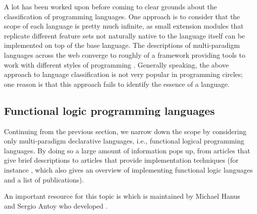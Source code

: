 \documentclass[thesis-solanki.tex]{subfiles}
\begin{document}
A lot has been worked upon before coming to clear grounds about the classification of programming languages.
One approach is to consider that the scope of each language is pretty much infinite, as small extension modules
that replicate different feature sets not naturally native to the language itself can be implemented on top of the
base language.
The descriptions of multi-paradigm languages across the web
\cite{website:wikimultiparadigm,website:mdn,website:blogc2} converge to roughly of a framework providing tools to
work with different styles of programming \cite{website:wikimpllist,website:dmoz}.
Generally speaking, the above approach to language classification is not very popular in programming circles; one
reason is that this approach fails to identify the essence of a language.

\subsection{Functional logic programming languages}

Continuing from the previous section, we narrow down the scope by considering only multi-paradigm declarative
languages, i.e., functional logical programming languages.
By doing so a large amount of information pops up, from articles that give brief descriptions
\cite{website:wikiflpl, website:wikiflpllist} to articles that provide implementation techniques (for instance
\cite{website:imlpementingflpl}, which also gives an overview of implementing functional logic languages and a list
of publications).

\begin{comment}
  The important piece however is the fact that there is a dedicated website \cite{website:funclogprog} for the
  history, research and development, existing languages, the literature, the contacts and everything else that one
  can think of for functional logic languages.
\end{comment}
An important resource for this topic is \cite{website:funclogprog} which is maintained by Michael Hanus
\cite{website:mhanus} and Sergio Antoy \cite{website:santoy} who developed  \cite{hanus1995curry}.

\begin{comment}
As a matter of fact the holy grail of information is maintained by two of the most important people in the field
Michael Hanus \cite{website:mhanus} and Sergio Antoy \cite{website:santoy}.
\end{comment}
\end{document}
